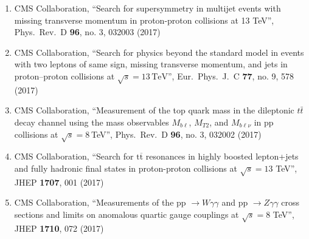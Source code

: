 \begin{enumerate}
\item CMS Collaboration, ``Search for supersymmetry in multijet events with missing transverse momentum in proton-proton collisions at 13 TeV'', Phys.\ Rev.\ D {\bf 96}, no. 3, 032003 (2017)

\item CMS Collaboration, ``Search for physics beyond the standard model in events with two leptons of same sign, missing transverse momentum, and jets in proton–proton collisions at $\sqrt{s} = 13\,\text {TeV} $'', Eur.\ Phys.\ J.\ C {\bf 77}, no. 9, 578 (2017)

\item CMS Collaboration, ``Measurement of the top quark mass in the dileptonic $t\bar{t}$ decay channel using the mass observables $M_{b\ell}$, $M_{T2}$, and $M_{b\ell\nu}$ in pp collisions at $\sqrt{s}=8$ TeV'', Phys.\ Rev.\ D {\bf 96}, no. 3, 032002 (2017)

\item CMS Collaboration, ``Search for $ \mathrm{t}\overline{\mathrm{t}} $ resonances in highly boosted lepton+jets and fully hadronic final states in proton-proton collisions at $ \sqrt{s}=13 $ TeV'', JHEP {\bf 1707}, 001 (2017)

\item CMS Collaboration, ``Measurements of the pp $\to W\gamma\gamma$ and pp $\to Z\gamma\gamma$ cross sections and limits on anomalous quartic gauge couplings at $ \sqrt{s}=8 $ TeV'', JHEP {\bf 1710}, 072 (2017)


\end{enumerate}
